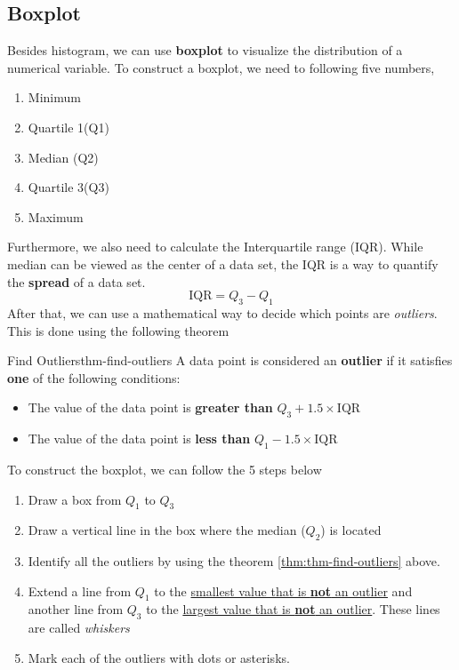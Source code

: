 \documentclass[math,code]{amznotes}
\theoremstyle{remark}
\begin{document}
\subsection{Boxplot}
Besides histogram, we can use \textbf{boxplot} to visualize the distribution of a numerical variable. To construct a boxplot, we need to following five numbers,
\begin{enumerate}
    \item Minimum
    \item Quartile 1(Q1)
    \item Median (Q2)
    \item Quartile 3(Q3)
    \item Maximum
\end{enumerate}
Furthermore, we also need to calculate the Interquartile range (IQR). While median can be viewed as the center of a data set, the IQR is a way to quantify the \textbf{spread} of a data set.
\begin{displaymath}
    \text{IQR}=Q_3-Q_1
\end{displaymath}
After that, we can use a mathematical way to decide which points are \textit{outliers}. This is done using the following theorem
\begin{thmbox}{Find Outliers}{thm-find-outliers}
    A data point is considered an {\color{red} \textbf{outlier}} if it satisfies \textbf{one} of the following conditions:
    \begin{itemize}
        \item The value of the data point is \textbf{greater than} $Q_3+1.5\times\text{IQR}$
        \item The value of the data point is \textbf{less than} $Q_1-1.5\times\text{IQR}$
    \end{itemize}
\end{thmbox}
To construct the boxplot, we can follow the 5 steps below
\begin{enumerate}
    \item Draw a box from $Q_1$ to $Q_3$
    \item Draw a vertical line in the box where the median ($Q_2$) is located
    \item Identify all the outliers by using the theorem \ref{thm:thm-find-outliers} above.
    \item Extend a line from $Q_1$ to the \underline{smallest value that is \textbf{not} an outlier} and another line from $Q_3$ to the \underline{largest value that is \textbf{not} an outlier}. These lines are called \textit{whiskers}
    \item Mark each of the outliers with dots or asterisks.
\end{enumerate}
\end{document}
